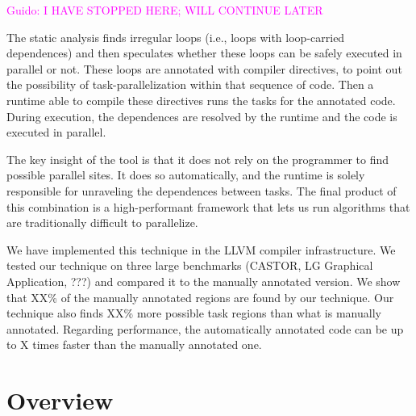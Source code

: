 \documentclass[pageno]{jpaper}
\newcommand{\guido}[1]{\noindent\textcolor{magenta}{Guido: {#1}}}
\newcommand{\guido}[1]{}
\begin{document}
\guido{I HAVE STOPPED HERE; WILL CONTINUE LATER}

The static analysis finds irregular loops (i.e., loops with loop-carried dependences) and then speculates 
whether these loops can be safely executed in parallel or not. These loops
are annotated with compiler directives, to point out the possibility of task-parallelization within that sequence of code. 
Then a runtime able to compile these directives runs the tasks for the annotated code. 
During execution, the dependences are resolved by the runtime and the code is executed in parallel. 

The key insight of the tool is that it does not rely on the programmer to find possible parallel sites. 
It does so automatically, and the runtime is solely responsible for unraveling the dependences between tasks. 
The final product of this combination is a high-performant framework that
lets us run algorithms that are traditionally difficult to parallelize.

We have implemented this technique in the LLVM compiler infrastructure. We tested our technique on three large benchmarks (CASTOR, LG Graphical Application, ???) and compared it to the manually annotated version. We show that XX\% of the manually annotated regions are found by our technique. Our technique also finds XX\% more possible task regions than what is manually annotated. Regarding performance, the automatically annotated code can be up to X times faster than the manually annotated one.



\section{Overview}
\label{sec:ovf}



\end{document}
